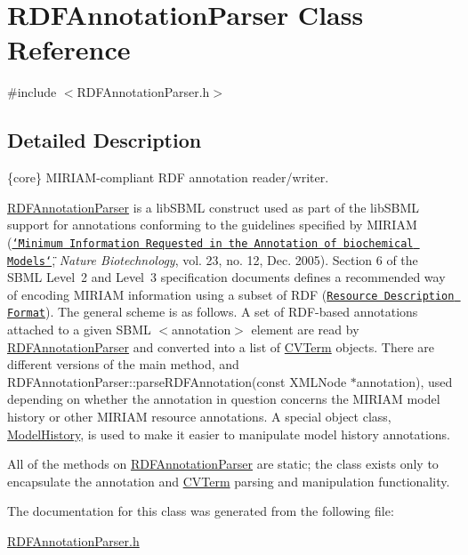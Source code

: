 \hypertarget{class_r_d_f_annotation_parser}{}\section{R\+D\+F\+Annotation\+Parser Class Reference}
\label{class_r_d_f_annotation_parser}


{\ttfamily \#include $<$R\+D\+F\+Annotation\+Parser.\+h$>$}



\subsection{Detailed Description}
\{core\} M\+I\+R\+I\+A\+M-\/compliant R\+DF annotation reader/writer.



\hyperlink{class_r_d_f_annotation_parser}{R\+D\+F\+Annotation\+Parser} is a lib\+S\+B\+ML construct used as part of the lib\+S\+B\+ML support for annotations conforming to the guidelines specified by M\+I\+R\+I\+AM (\href{http://www.nature.com/nbt/journal/v23/n12/abs/nbt1156.html}{\tt \char`\"{}\+Minimum
\+Information Requested in the Annotation of biochemical Models\char`\"{}}, {\itshape Nature Biotechnology}, vol. 23, no. 12, Dec. 2005). Section 6 of the S\+B\+ML Level~2 and Level~3 specification documents defines a recommended way of encoding M\+I\+R\+I\+AM information using a subset of R\+DF (\href{http://www.w3.org/RDF/}{\tt Resource Description Format}). The general scheme is as follows. A set of R\+D\+F-\/based annotations attached to a given S\+B\+ML {\ttfamily $<$annotation$>$} element are read by \hyperlink{class_r_d_f_annotation_parser}{R\+D\+F\+Annotation\+Parser} and converted into a list of \hyperlink{class_c_v_term}{C\+V\+Term} objects. There are different versions of the main method, and R\+D\+F\+Annotation\+Parser\+::parse\+R\+D\+F\+Annotation(const X\+M\+L\+Node $\ast$annotation), used depending on whether the annotation in question concerns the M\+I\+R\+I\+AM model history or other M\+I\+R\+I\+AM resource annotations. A special object class, \hyperlink{class_model_history}{Model\+History}, is used to make it easier to manipulate model history annotations.

All of the methods on \hyperlink{class_r_d_f_annotation_parser}{R\+D\+F\+Annotation\+Parser} are static; the class exists only to encapsulate the annotation and \hyperlink{class_c_v_term}{C\+V\+Term} parsing and manipulation functionality. 

The documentation for this class was generated from the following file\+:\begin{DoxyCompactItemize}
\item 
\hyperlink{_r_d_f_annotation_parser_8h}{R\+D\+F\+Annotation\+Parser.\+h}\end{DoxyCompactItemize}
